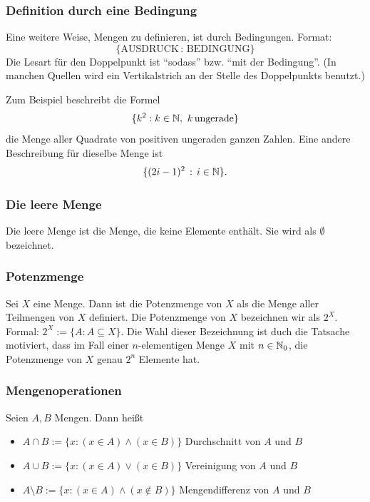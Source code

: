 \subsubsection{Definition durch eine Bedingung}

Eine weitere Weise, Mengen zu definieren, ist durch Bedingungen. Format:
\[
			 \{ \text{AUSDRUCK} \,  : \, \text{BEDINGUNG} \}
\]
Die Lesart für den Doppelpunkt ist ``sodass''  bzw.  ``mit der Bedingung''.  (In manchen Quellen wird ein Vertikalstrich an der Stelle des Doppelpunkts benutzt.)

Zum Beispiel beschreibt die Formel
 \[
 	\{ k^2 : k \in \mathbb N, \ k \, \text{ungerade} \} 
 \] die Menge aller Quadrate von positiven ungeraden ganzen Zahlen. Eine andere Beschreibung für dieselbe Menge ist 
 \[
 	\{  (2i -1)^2  \, :\, i \in \mathbb N\}.
 \] 



\subsubsection{Die leere Menge}

Die leere Menge ist die Menge, die keine Elemente enthält. Sie wird als $ \emptyset $ bezeichnet. 

\subsubsection{Potenzmenge}

Sei $ X $ eine Menge. Dann ist die Potenzmenge von $ X $ als die Menge aller Teilmengen von $ X $ definiert. Die Potenzmenge von $X$ bezeichnen wir als  $ 2^X $. Formal: $ 2^X := \{ A : A \subseteq X \} $. Die Wahl dieser Bezeichnung ist duch die Tatsache motiviert, dass im Fall einer $n$-elementigen Menge $X$ mit $n \in \mathbb N_0$, die Potenzmenge von $X$ genau $2^n$ Elemente hat. 


\subsubsection{Mengenoperationen}

Seien $ A,B $ Mengen. Dann heißt
\begin{itemize}
\item $ A \cap B := \{ x : (x \in A) \wedge (x \in B) \} $ Durchschnitt von $ A $ und $ B $
\item $ A \cup B := \{ x : (x \in A) \vee (x \in B) \} $ Vereinigung von $ A $ und $ B $
\item $ A \setminus B := \{ x : (x \in A) \wedge (x \notin B) \} $ Mengendifferenz von $ A $ und $ B $
\end{itemize}


